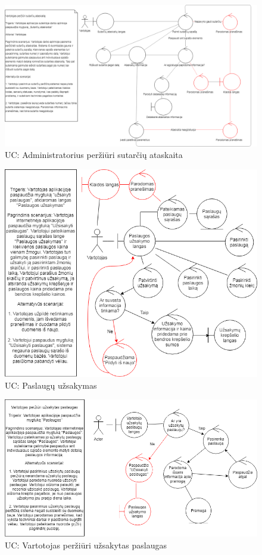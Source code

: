 \documentclass[oneside]{VUMIFPSkursinis}
\begin{document}
\begin{figure}[h]
    \centering
    \includegraphics[width=1.0\textwidth]{Rob5.png}
    \caption{UC: Administratorius peržiūri sutarčių ataskaita}
    \label{fig:rob5}
\end{figure}
\vskip 1cm

\begin{figure}[h]
    \centering
    \includegraphics[width=1.0\textwidth]{rob6.png}
    \caption{UC: Paslaugų užsakymas}
    \label{fig:rob6}
\end{figure}
\vskip 1cm

\begin{figure}[h]
    \centering
    \includegraphics[width=1.0\textwidth]{Robust7.png}
    \caption{UC: Vartotojas peržiūri užsakytas paslaugas}
    \label{fig:rob7}
\end{figure}
\vskip 1cm
\end{document}
